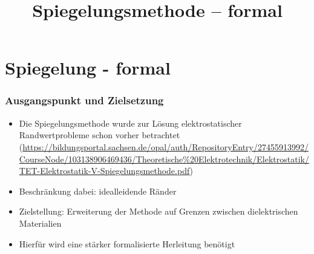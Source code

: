 
\usepackage{tikz-3dplot}
\title[TET Vertiefung: Spiegelungsmethode -- formal]{Spiegelungsmethode -- formal}


% 
% 

\maketitle

% 
% 
\section{Spiegelung - formal}

\begin{frame}
  \frametitle{Ausgangspunkt und Zielsetzung}

    \begin{itemize}[<+->]
    \item Die \alert{Spiegelungsmethode} wurde zur Lösung elektrostatischer Randwertprobleme schon vorher betrachtet (\url{https://bildungsportal.sachsen.de/opal/auth/RepositoryEntry/27455913992/CourseNode/103138906469436/Theoretische\%20Elektrotechnik/Elektrostatik/TET-Elektrostatik-V-Spiegelungsmethode.pdf})
      \item Beschränkung dabei: \alert{idealleidende} Ränder 
    \item Zielstellung: Erweiterung der Methode auf Grenzen zwischen \alert{dielektrischen} Materialien
    \item Hierfür wird eine \alert{stärker formalisierte Herleitung} benötigt
    \end{itemize}
\end{frame}

